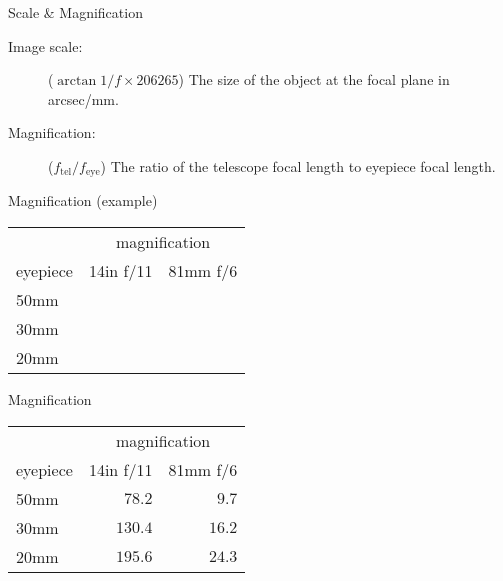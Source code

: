 
\begin{frame}{Scale \& Magnification}
  \begin{description}
    \item[Image scale:]  ($\arctan{1/f} \times 206265$) The size of the object at the focal plane in arcsec/mm.
    \item[Magnification:] ($f_{\textrm{tel}}/f_{\textrm{eye}}$) The ratio of the telescope focal length to eyepiece focal length.
    \end{description}
     
  \vfill

  \centering
\end{frame}


\begin{frame}{Magnification (example)}
  \Large
  \begin{table}[]
    \centering
    \begin{tabular}{@{}lrr@{}}
    \toprule
         & \multicolumn{2}{c}{magnification} \\ \cmidrule(lr){2-3}
    eyepiece & 14in f/11  & 81mm f/6  \\ \midrule
    50mm &   & \\
    30mm &   & \\
    20mm &   & \\ \bottomrule
    \end{tabular}
  \end{table}
  
  \end{frame}

\begin{frame}{Magnification}
  \Large
  \begin{table}[]
    \centering
    \begin{tabular}{@{}lrr@{}}
    \toprule
         & \multicolumn{2}{c}{magnification} \\ \cmidrule(lr){2-3}
    eyepiece & 14in f/11  & 81mm f/6  \\ \midrule
    50mm &  $78.2$ &  $9.7$ \\
    30mm & $130.4$ & $16.2$ \\
    20mm & $195.6$ & $24.3$ \\ \bottomrule
    \end{tabular}
  \end{table}
  
  \end{frame}

